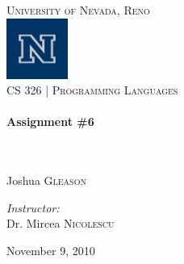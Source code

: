 \begin{titlepage}
\begin{center}

\textsc{\LARGE University of Nevada, Reno}\\[.5cm]
\includegraphics[width=0.15\textwidth]{./logo.png}\\[.5cm]

\textsc{\large CS 326 | Programming Languages } \\[.5cm]

\HRule \\[0.4cm]
{ \huge \bfseries Assignment \#6}\\[0.4cm]

\HRule \\[1.5cm]

\begin{minipage}{0.4\textwidth}
  \begin{flushleft} \large
    \emph{}\\
    Joshua \textsc{Gleason}\\
  \end{flushleft}
\end{minipage}
\begin{minipage}{0.4\textwidth}
  \begin{flushright} \large
    \emph{Instructor:} \\
    Dr. Mircea \textsc{Nicolescu}
  \end{flushright}
\end{minipage}

\vspace*{\fill}



\vspace*{\fill}

{\large November 9, 2010}

\end{center}

\end{titlepage}

